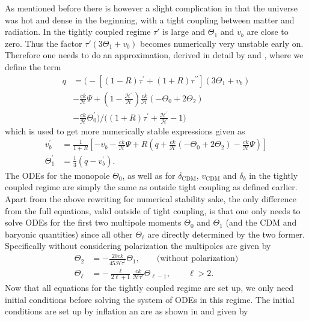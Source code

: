 \documentclass[twocolumn]{aastex62}
\begin{document}
As mentioned before there is however a slight complication in that the universe was hot and dense in the beginning, with a tight coupling between matter and radiation. In the tightly coupled regime $\tau'$ is large and $\Theta_1$ and $v_b$ are close to zero. Thus the factor $\tau' (3\Theta_1 + v_b)$ becomes numerically very unstable early on. Therefore one needs to do an approximation, derived in detail by \cite{callin:2006} and \cite{winther:2020b}, where we define the term 
\begin{align}
q &= \bigr(-[(1-R)\tau^\prime + (1+R)\tau^{\prime\prime}](3\Theta_1+v_b) \\&-
            \frac{ck}{\mathcal{H}}\Psi + (1-\frac{\mathcal{H}^\prime}{\mathcal{H}})\frac{ck}{\mathcal{H}}(-\Theta_0 +
            2\Theta_2) \\ &- \frac{ck}{\mathcal{H}}\Theta_0^\prime\bigr)/\bigl((1+R)\tau^\prime + \frac{\mathcal{H}^\prime}{\mathcal{H}} -
            1\bigr)
\end{align}
which is used to get more numerically stable expressions given as 
\begin{align}
    v_b^\prime &= \frac{1}{1+R} \left[-v_b - \frac{ck}{\mathcal{H}}\Psi + R(q +
    \frac{ck}{\mathcal{H}}(-\Theta_0 + 2\Theta_2) - \frac{ck}{\mathcal{H}}\Psi)\right]\\
    \Theta^\prime_1 &= \frac{1}{3} (q - v_b^\prime).
\end{align}
The ODEs for the monopole $\Theta_0$, as well as for $\delta_\mathrm{CDM}$, $v_\mathrm{CDM}$ and $\delta_b$ in the tightly coupled regime are simply the same as outside tight coupling as defined earlier.
Apart from the above rewriting for numerical stability sake, the only difference from the full equations, valid outside of tight coupling, is that one only needs to solve ODEs for the first two multipole moments $\Theta_0$ and $\Theta_1$ (and the CDM and baryonic quantities) since all other $\Theta_\ell$ are directly determined by the two former. Specifically without considering polarization the multipoles are given by
\begin{align}
    \Theta_2 &= 
    -\frac{20ck}{45\mathcal{H}\tau^\prime} \Theta_1, \quad\quad \textrm{(without polarization)}\\ 
    \Theta_\ell &= -\frac{\ell}{2\ell+1} \frac{ck}{\mathcal{H}\tau'} \Theta_{\ell-1}, \quad\quad \ell > 2.
\end{align}
Now that all equations for the tightly coupled regime are set up, we only need initial conditions before solving the system of ODEs in this regime. The initial conditions are set up by inflation an are as shown in \cite{winther:2020b} and \cite{callin:2006} given by 
\end{document}
